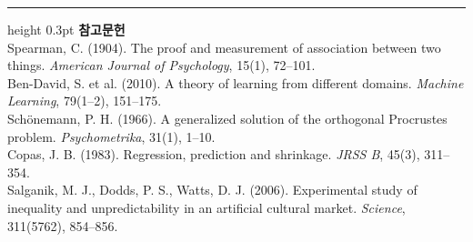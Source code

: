 \documentclass[10pt]{article}
\begin{document}
\vspace{0.6em}
\hrule height 0.3pt
\vspace{0.5em}
{\footnotesize
\textbf{참고문헌}\\[0.3em]
Spearman, C. (1904). The proof and measurement of association between two things.
\emph{American Journal of Psychology}, 15(1), 72--101.\\[0.15em]
Ben-David, S. et al. (2010). A theory of learning from different domains.
\emph{Machine Learning}, 79(1--2), 151--175.\\[0.15em]
Schönemann, P. H. (1966). A generalized solution of the orthogonal Procrustes
problem. \emph{Psychometrika}, 31(1), 1--10.\\[0.15em]
Copas, J. B. (1983). Regression, prediction and shrinkage. \emph{JRSS B},
45(3), 311--354.\\[0.15em]
Salganik, M. J., Dodds, P. S., Watts, D. J. (2006). Experimental study of
inequality and unpredictability in an artificial cultural market.
\emph{Science}, 311(5762), 854--856.
}
\end{document}
